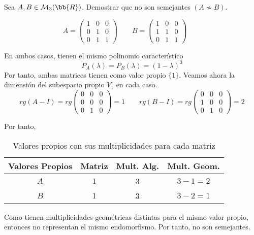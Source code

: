 \begin{ejercicio}
    Sea $A,B \in \mathcal{M}_3(\bb{R})$. Demostrar que no son semejantes $(A\nsim B)$.

    \begin{equation*}
        A = \left( \begin{array}{ccc}
            1 & 0 & 0 \\
            0 & 1 & 0 \\
            0 & 1 & 1
        \end{array}\right) \qquad 
        B = \left( \begin{array}{ccc}
            1 & 0 & 0 \\
            1 & 1 & 0 \\
            0 & 1 & 1
        \end{array}\right) \qquad
    \end{equation*}

    En ambos casos, tienen el mismo polinomio característico
    $$P_A(\lambda) = P_B(\lambda) = (1-\lambda)^3$$
    Por tanto, ambas matrices tienen como valor propio $\{1\}$. Veamos ahora la dimensión del subespacio propio $V_1$ en cada caso.
    \begin{equation*}
        rg(A-I) = rg\left( \begin{array}{ccc}
            0 & 0 & 0 \\
            0 & 0 & 0 \\
            0 & 1 & 0
        \end{array}\right) = 1 \qquad
        rg(B-I) = rg\left( \begin{array}{ccc}
            0 & 0 & 0 \\
            1 & 0 & 0 \\
            0 & 1 & 0
        \end{array}\right) = 2
    \end{equation*}

    Por tanto,
    \begin{table}[H]
        \centering
        \begin{tabular}{c|c|c|c}
            Valores Propios & Matriz & Mult. Alg. & Mult. Geom. \\ \hline 
            $A$ & $1$ & 3 & $3-1=2$\\
            $B$ & $1$ & 3 & $3-2=1$\\
        \end{tabular}
        \caption{Valores propios con sus multiplicidades para cada matriz}
    \end{table}

    Como tienen multiplicidades geométricas distintas para el mismo valor propio, entonces no representan el mismo endomorfismo. Por tanto, no son semejantes.
\end{ejercicio}


